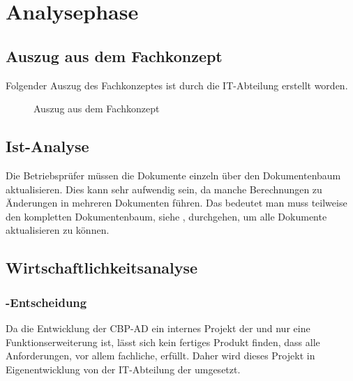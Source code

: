 
\clearpage
\section{Analysephase} 
\label{sec:Analysephase}

\subsection{Auszug aus dem Fachkonzept}
\label{sec:AuszugFachkonzept}

Folgender Auszug des Fachkonzeptes ist durch die IT-Abteilung erstellt worden.

\begin{figure}[h]
	\centering
	\caption{Auszug aus dem Fachkonzept}
\end{figure}

\clearpage
\subsection{Ist-Analyse} 
\label{sec:IstAnalyse}

Die Betriebsprüfer müssen die Dokumente einzeln über den Dokumentenbaum aktualisieren. Dies kann sehr aufwendig sein, da manche Berechnungen zu Änderungen in mehreren Dokumenten führen. Das bedeutet man muss teilweise den kompletten Dokumentenbaum, siehe , durchgehen, um alle Dokumente aktualisieren zu können.


\subsection{Wirtschaftlichkeitsanalyse}
\label{sec:Wirtschaftlichkeitsanalyse}

\subsubsection{-Entscheidung}
\label{sec:MakeOrBuyEntscheidung}

Da die Entwicklung der \acs{CBP-AD} ein internes Projekt der \DRV und nur eine Funktionserweiterung ist, lässt sich kein fertiges Produkt finden, dass alle Anforderungen, vor allem fachliche, erfüllt. Daher wird dieses Projekt in Eigenentwicklung von der IT-Abteilung der \DRV umgesetzt.

